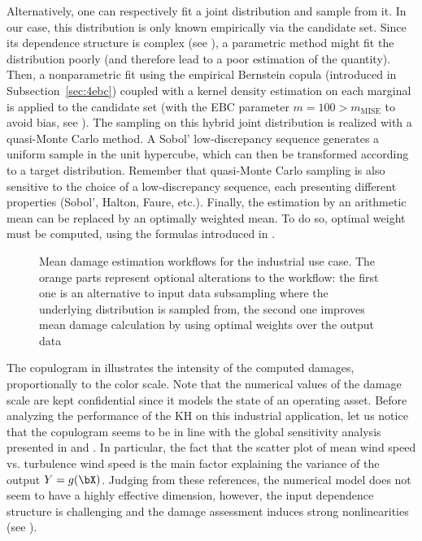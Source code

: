 Alternatively, one can respectively fit a joint distribution and sample from it. 
In our case, this distribution is only known empirically via the candidate set. 
Since its dependence structure is complex (see ), a parametric method might fit the distribution poorly (and therefore lead to a poor estimation of the quantity). 
Then, a nonparametric fit using the empirical Bernstein copula (introduced in Subsection~\ref{sec:4ebc}) coupled with a kernel density estimation on each marginal is applied to the candidate set (with the EBC parameter $m=100 > m_{\mbox{MISE}}$ to avoid bias, see \citealp[p.117]{lasserre_2022}). 
The sampling on this hybrid joint distribution is realized with a quasi-Monte Carlo method. 
A Sobol' low-discrepancy sequence generates a uniform sample in the unit hypercube, which can then be transformed according to a target distribution. 
Remember that quasi-Monte Carlo sampling is also sensitive to the choice of a low-discrepancy sequence, each presenting different properties (Sobol', Halton, Faure, etc.). 
Finally, the estimation by an arithmetic mean can be replaced by an optimally weighted mean. 
To do so, optimal weight must be computed, using the formulas introduced in .

\begin{figure}[!h]
    \centering
    
    \caption{Mean damage estimation workflows for the industrial use case. 
    The orange parts represent optional alterations to the workflow: 
    the first one is an alternative to input data subsampling where the underlying distribution is sampled from, 
    the second one improves mean damage calculation by using optimal weights over the output data}
    \label{fig:sampling_diagram}
\end{figure}


The copulogram in  illustrates the intensity of the computed damages, proportionally to the color scale. 
Note that the numerical values of the damage scale are kept confidential since it models the state of an operating asset.
Before analyzing the performance of the KH on this industrial application, let us notice that the copulogram  seems to be in line with the global sensitivity analysis presented in \cite{murcia_dimitrov_2018} and \cite{li_zhan_2020}. 
In particular, the fact that the scatter plot of mean wind speed vs. turbulence wind speed is the main factor explaining the variance of the output $Y=g(\bX)$. 
Judging from these references, the numerical model does not seem to have a highly effective dimension, however, the input dependence structure is challenging and the damage assessment induces strong nonlinearities (see ). 

